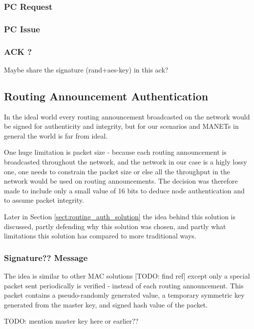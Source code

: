\subsubsection*{\acf{PC} Request}

\subsubsection*{\acf{PC} Issue}

\subsubsection*{ACK ?}
Maybe share the signature (rand+aes-key) in this ack?



\subsection{Routing Announcement Authentication}
In the ideal world every routing announcement broadcasted on the network would
be signed for authenticity and integrity, but for our scenarios and \acp{MANET}
in general the world is far from ideal.

One huge limitation is packet size - because each routing announcement is
broadcasted throughout the network, and the network in our case is a higly lossy
one, one needs to constrain the packet size or else all the throughput in the
network would be used on routing announcements. The decision was therefore made to
include only a small value of 16 bits to deduce node authentication and to
assume packet integrity.

Later in Section \ref{sect:routing_auth_solution} the idea  behind this
solution is discussed, partly defending why this solution was chosen, and partly
what limitations this solution has compared to more traditional ways.

\subsubsection*{Signature?? Message}

The idea is similar to other \ac{MAC} solutions [TODO: find ref] except only a
special packet sent periodically is verified - instead of each routing announcement.
This packet contains a pseudo-randomly generated value, a temporary symmetric
key generated from the master key, and signed hash value of the packet.

TODO: mention master key here or earlier??

